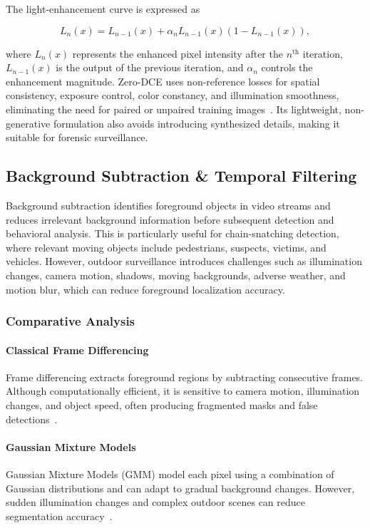 \documentclass[runningheads]{llncs}
\begin{document}
The light-enhancement curve is expressed as

\begin{equation}
L_{n}(x)=L_{n-1}(x)+\alpha_{n}L_{n-1}(x)
\left(1-L_{n-1}(x)\right),
\label{eq:zerodce}
\end{equation}

where $L_n(x)$ represents the enhanced pixel intensity after the $n^{\text{th}}$ iteration, $L_{n-1}(x)$ is the output of the previous iteration, and $\alpha_n$ controls the enhancement magnitude. Zero-DCE uses non-reference losses for spatial consistency, exposure control, color constancy, and illumination smoothness, eliminating the need for paired or unpaired training images~\cite{zerodce}. Its lightweight, non-generative formulation also avoids introducing synthesized details, making it suitable for forensic surveillance.


\subsection{Background Subtraction \& Temporal Filtering}

Background subtraction identifies foreground objects in video streams and reduces irrelevant background information before subsequent detection and behavioral analysis. This is particularly useful for chain-snatching detection, where relevant moving objects include pedestrians, suspects, victims, and vehicles. However, outdoor surveillance introduces challenges such as illumination changes, camera motion, shadows, moving backgrounds, adverse weather, and motion blur, which can reduce foreground localization accuracy.

\subsubsection{Comparative Analysis}

\paragraph{Classical Frame Differencing}
Frame differencing extracts foreground regions by subtracting consecutive frames. Although computationally efficient, it is sensitive to camera motion, illumination changes, and object speed, often producing fragmented masks and false detections~\cite{framediff}.

\paragraph{Gaussian Mixture Models}
Gaussian Mixture Models (GMM) model each pixel using a combination of Gaussian distributions and can adapt to gradual background changes. However, sudden illumination changes and complex outdoor scenes can reduce segmentation accuracy~\cite{gmm}.
\end{document}
